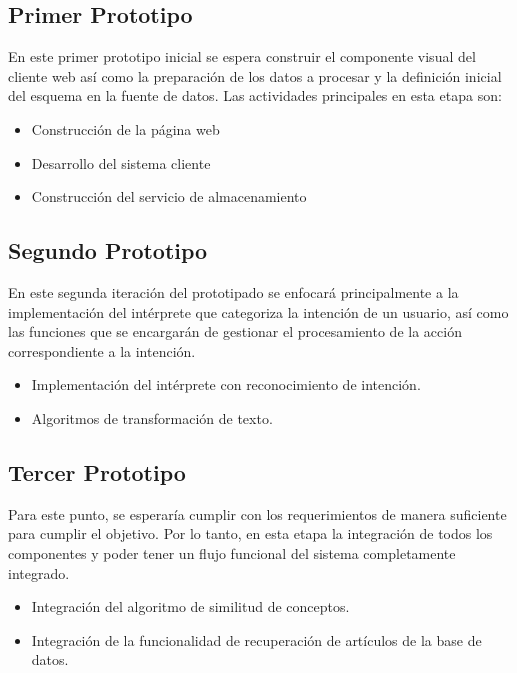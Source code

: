 \subsection{Primer Prototipo}

En este primer prototipo inicial se espera construir el componente visual del  cliente web así como la preparación de los datos a procesar y la definición inicial del esquema en la fuente de datos. Las actividades principales en esta etapa son:

\begin{itemize}
    \item Construcción de la página web
    \item Desarrollo del sistema cliente
    \item Construcción del servicio de almacenamiento
\end{itemize}

\subsection{Segundo Prototipo}

En este segunda iteración del prototipado se enfocará principalmente a la implementación del intérprete que categoriza la intención de un usuario, así como las funciones que se encargarán de gestionar el procesamiento de la acción correspondiente a la intención.

\begin{itemize}
    \item Implementación del intérprete con reconocimiento de intención.
    \item Algoritmos de transformación de texto.
\end{itemize}

\subsection{Tercer Prototipo}

Para este punto, se esperaría cumplir con los requerimientos de manera suficiente para cumplir el objetivo. Por lo tanto, en esta etapa la integración de todos los componentes y poder tener un flujo funcional del sistema completamente integrado.

\begin{itemize}
    \item Integración del algoritmo de similitud de conceptos.
    \item Integración de la funcionalidad de recuperación de artículos de la base de datos.
\end{itemize}

